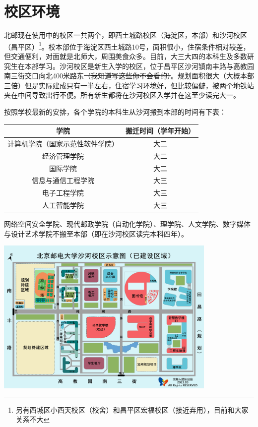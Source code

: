 \section{校区环境}

北邮现在使用中的校区一共两个，即西土城路校区（海淀区，本部）和沙河校区（昌平区）\footnote{另有西城区小西天校区（校舍）和昌平区宏福校区（接近弃用），目前和大家关系不大}。校本部位于海淀区西土城路10号，面积很小，住宿条件相对较差，但交通便利，对面就是北师大，周围美食众多。目前，大三大四的本科生及多数研究生在本部学习。沙河校区是新生入学的校区，位于昌平区沙河镇南丰路{\small{}与高教园南三街交口向北400米路东\sout{（我知道写这些你不会看的）}}。规划面积很大（大概本部三倍）但是实际建成只有一半左右，住宿学习环境好，但比较偏僻，被两个地铁站夹在中间导致出行不便。所有新生都将在沙河校区入学并在这至少读完大一。

按照学校最新的安排，各个学院的本科生从沙河搬到本部的时间有下表：

\begin{center}
    \begin{tabular}{cc}
        \toprule
        学院 & 搬迁时间（学年开始） \\
        \midrule
        计算机学院（国家示范性软件学院） & 大二 \\
        经济管理学院 & 大二 \\
        国际学院 & 大二\\
        信息与通信工程学院 & 大三 \\
        电子工程学院 & 大三 \\
        人工智能学院 & 大三 \\
        \bottomrule
    \end{tabular}
\end{center}

网络空间安全学院、现代邮政学院（自动化学院）、理学院、人文学院、数字媒体与设计艺术学院不搬至本部（即在沙河校区读完本科四年）。

\begin{center}
    \includegraphics[width=0.80\textwidth]{images/shahe-map.jpg}
\end{center}


